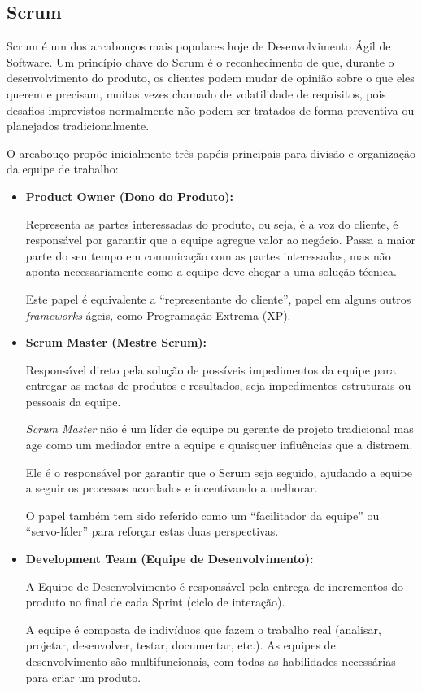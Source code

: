 \subsection{Scrum}
\par Scrum é um dos arcabouços mais populares hoje de Desenvolvimento Ágil de Software. Um princípio chave do Scrum é o reconhecimento de que, durante o desenvolvimento do produto, os clientes podem mudar de opinião sobre o que eles querem e precisam, muitas vezes chamado de volatilidade de requisitos, pois desafios imprevistos normalmente não podem ser tratados de forma preventiva ou planejados tradicionalmente.
\par O arcabouço propõe inicialmente três papéis principais para divisão e organização da equipe de trabalho:
\begin{itemize}
\item\textbf{Product Owner (Dono do Produto):}
\par Representa as partes interessadas do produto, ou seja, é a voz do cliente, é responsável por garantir que a equipe agregue valor ao negócio. Passa a maior parte do seu tempo em comunicação com as partes interessadas, mas não aponta necessariamente como a equipe deve chegar a uma solução técnica.
\par Este papel é equivalente a ``representante do cliente'', papel em alguns outros \emph{frameworks} ágeis, como Programação Extrema (XP).
\item\textbf{Scrum Master (Mestre Scrum):}
\par Responsável direto pela solução de possíveis impedimentos da equipe para entregar as metas de produtos e resultados, seja impedimentos estruturais ou pessoais da equipe.
\par \emph{Scrum Master} não é um líder de equipe ou gerente de projeto tradicional mas age como um mediador entre a equipe e quaisquer influências que a distraem.
\par Ele é o responsável por garantir que o Scrum seja seguido, ajudando a equipe a seguir os processos acordados e incentivando a melhorar.
\par O papel também tem sido referido como um ``facilitador da equipe'' ou ``servo-líder'' para reforçar estas duas perspectivas.
\item\textbf{Development Team (Equipe de Desenvolvimento):}
\par A Equipe de Desenvolvimento é responsável pela entrega de incrementos do produto no final de cada Sprint (ciclo de interação).
\par A equipe é composta de indivíduos que fazem o trabalho real (analisar, projetar, desenvolver, testar, documentar, etc.). As equipes de desenvolvimento são multifuncionais, com todas as habilidades necessárias para criar um produto.
\end{itemize}
